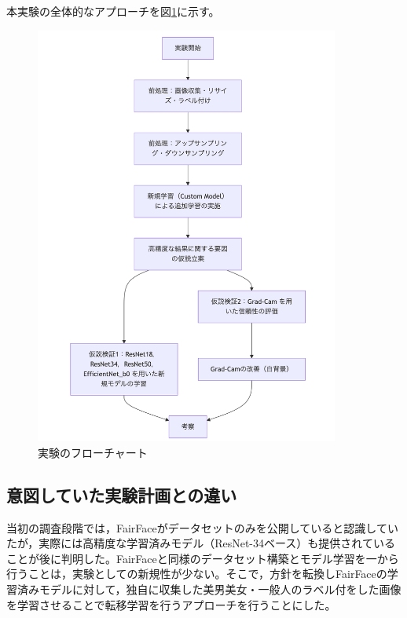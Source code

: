 \documentclass[a4paper,11pt,titlepage]{jsarticle}
\begin{document}
本実験の全体的なアプローチを図\ref{fig:csv}に示す。
\begin{figure}[H]
    \centering
    \includegraphics[width=100mm]{overall.png}
    \caption{実験のフローチャート}
    \label{fig:csv}
\end{figure}

\subsection{意図していた実験計画との違い}
\label{label:意図していた実験計画との違い}
当初の調査段階では，FairFaceがデータセットのみを公開していると認識していたが，実際には高精度な学習済みモデル（ResNet-34ベース）も提供されていることが後に判明した。FairFaceと同様のデータセット構築とモデル学習を一から行うことは，実験としての新規性が少ない。そこで，方針を転換しFairFaceの学習済みモデルに対して，独自に収集した美男美女・一般人のラベル付をした画像を学習させることで転移学習を行うアプローチを行うことにした。\par
\end{document}
